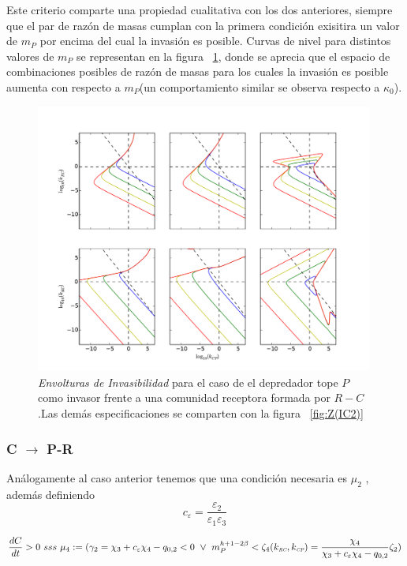 Este criterio comparte una propiedad cualitativa con los dos anteriores, siempre que el par de raz\'on de masas cumplan con la primera condici\'on exisitira un valor de $m_P$ por encima del cual la invasi\'on es posible. Curvas de nivel para distintos valores de $m_P$ se representan en la figura ~\ref{fig:Z(IC4)}, donde se aprecia que el espacio de combinaciones posibles de raz\'on de masas para los cuales la invasi\'on es posible aumenta con respecto a $m_P$(un comportamiento similar se observa respecto a $\kappa_0$).


\begin{figure}
  \centering
  \includegraphics[width = 0.99\textwidth]{./Plots/Z(IC4)AcGrGr.pdf}
  \caption[Env $Z(IC4)$]{\emph{Envolturas de Invasibilidad} para el caso de el depredador tope $P$ como invasor frente a una comunidad receptora formada por $R-C$ .Las dem\'as especificaciones se comparten con la figura ~\ref{fig:Z(IC2)}}
  \label{fig:Z(IC4)}
\end{figure}


\subsubsection{C $\to$ P-R}
An\'alogamente al caso anterior tenemos que una condici\'on necesaria es $\mu_2$ , adem\'as definiendo
\begin{equation}
  c_\varepsilon = \frac{\varepsilon_2}{\varepsilon_1\varepsilon_3}
\end{equation}

\begin{equation}
\frac{dC}{dt}  >0 \ sss \ \mu_4 := (\gamma_2 = \chi_3 + c_\varepsilon \chi_4 - q_{0,2} < 0 \ \lor \  m_P^{h + 1 - 2\beta} < \zeta_4(k_{\textit{\tiny RC}},k_{\textit{\tiny CP}}) = \frac{\chi_4}{\chi_3 + c_\varepsilon \chi_4 - q_{0,2}} \zeta_2 )
\end{equation}


